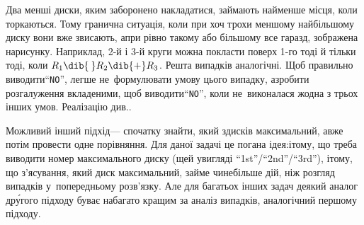 \Tutorial
Два менші диски, яким заборонено накладатися, займають найменше місця, коли торкаються. 
Тому гранична ситуація, коли при хоч трохи меншому найбільшому диску вони вже звисають, а\nolinebreak[3] при рівно такому або більшому все гаразд, зображена на\nolinebreak[2] рисунку. Наприклад, \mbox{2-й} і \mbox{3-й} круги можна покласти поверх \mbox{1-го} тоді й тільки тоді, коли $R_1\dib{{\>}}R_2\dib{{+}}R_3$. Решта випадків аналогічні.
Щоб правильно виводити\nolinebreak[3] ``\texttt{NO}'', легше не~формулювати умову цього випадку, а\nolinebreak[3] зробити розгалуження вкладеними, щоб виводити\nolinebreak[3] ``\texttt{NO}'', коли не~виконалася жодна з трьох інших умов.
Реалізацію див.\nolinebreak[2] .

Можливий інший підхід\nolinebreak[3] --- спочатку знайти, який з\nolinebreak[3] дисків максимальний, а\nolinebreak[3] вже потім провести одне порівняння. Для даної задачі це погана ідея:\linebreak[1] і\nolinebreak[3] тому, що треба виводити номер максимального диску (ще\nolinebreak[3] й у\nolinebreak[3] вигляді ``1st''/``2nd''/``3rd''), і\nolinebreak[3] тому, що з'ясування, який диск максимальний, займе чи\nolinebreak[3] не\nolinebreak[3] більше дій, ніж розгляд випадків у~попередньому розв'язку. Але для багатьох інших задач \mbox{деякий} аналог др\'{у}гого підходу буває набагато кращим за аналіз випадків, аналогічний першому підходу.
